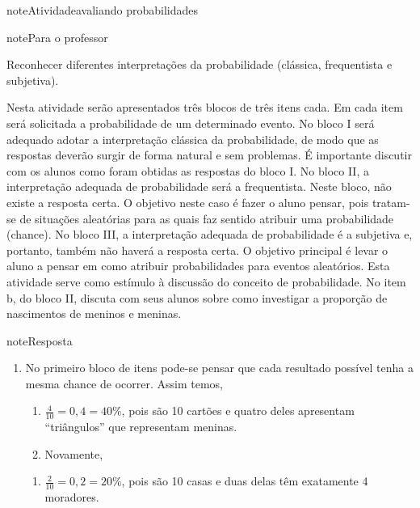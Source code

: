 \begin{sphinxadmonition}{note}{Atividade}{avaliando probabilidades}
\label{ativ-calculando-probabilidades}

\begin{sphinxadmonition}{note}{Para o professor}

  Reconhecer diferentes interpretações da probabilidade (clássica, frequentista e subjetiva).

 Nesta atividade serão apresentados três blocos de três itens cada. Em cada item será solicitada a probabilidade de um determinado evento. No bloco I será adequado adotar a interpretação clássica da probabilidade, de modo que as respostas deverão surgir de forma natural e sem problemas. É importante discutir com os alunos como foram obtidas as respostas do bloco I. No bloco II, a interpretação adequada de probabilidade será a frequentista. Neste bloco, não existe a resposta certa. O objetivo neste caso é fazer o aluno pensar, pois tratam-se de situações aleatórias para as quais faz sentido atribuir uma probabilidade (chance). No bloco III, a interpretação adequada de probabilidade é a subjetiva e, portanto, também não haverá a resposta certa. O objetivo principal é levar o aluno a pensar em como atribuir probabilidades para eventos aleatórios.  Esta atividade serve como estímulo à discussão do conceito de probabilidade. No item b, do bloco II, discuta com seus alunos sobre como investigar a proporção de nascimentos de meninos e meninas.

\begin{sphinxadmonition}{note}{Resposta}

\begin{enumerate}
\item {} 
No primeiro bloco de itens pode-se pensar que cada resultado possível tenha a mesma chance de ocorrer. Assim temos,
\begin{enumerate}
\item {} 
\(\frac{4}{10}=0,4=40\%\), pois são 10 cartões e quatro deles apresentam “triângulos” que representam meninas.

\item {} 
Novamente,

\end{enumerate}
\begin{enumerate}
\item {} 
\(\frac{2}{10}=0,2=20\%\), pois são 10 casas e duas delas têm exatamente 4 moradores.


\end{enumerate}
\end{enumerate}
\end{sphinxadmonition}
\end{sphinxadmonition}
\end{sphinxadmonition}
